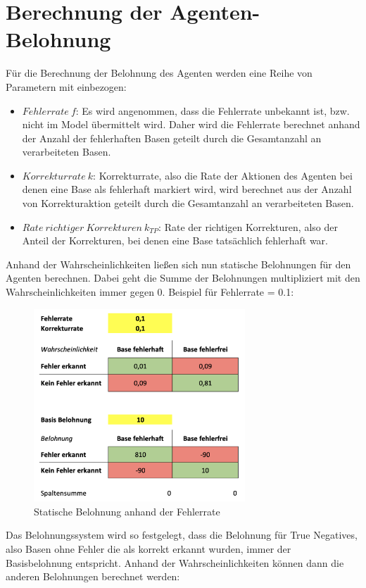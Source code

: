 \documentclass[oneside,bibliography=totocnumbered,BCOR=5mm]{scrbook}%
\theoremstyle{definition}
\theoremstyle{definition}
\theoremstyle{definition}
\theoremstyle{definition}
\theoremstyle{definition}
\theoremstyle{definition}
\begin{document}
\section{Berechnung der Agenten-Belohnung}
Für die Berechnung der Belohnung des Agenten werden eine Reihe von Parametern mit einbezogen:
\begin{itemize}
  \item \(Fehlerrate\:f\): Es wird angenommen, dass die Fehlerrate unbekannt ist, bzw. nicht im Model übermittelt wird. 
Daher wird die Fehlerrate berechnet anhand der Anzahl der fehlerhaften Basen geteilt durch 
die Gesamtanzahl an verarbeiteten Basen.
\item \(Korrekturrate\:k\): Korrekturrate, also die Rate der Aktionen des Agenten bei denen eine Base als fehlerhaft markiert wird,
 wird berechnet aus der Anzahl von Korrekturaktion geteilt durch die Gesamtanzahl an verarbeiteten Basen.
 \item \(Rate\:richtiger\:Korrekturen\:k_{TP}\): Rate der richtigen Korrekturen, also der Anteil der Korrekturen, bei
 denen eine Base tatsächlich fehlerhaft war.
\end{itemize}


Anhand der Wahrscheinlichkeiten ließen sich nun statische Belohnungen für den Agenten berechnen.
Dabei geht die Summe der Belohnungen multipliziert mit den Wahrscheinlichkeiten immer gegen 0.
Beispiel für Fehlerrate = 0.1:

\begin{figure}
  \centering
  \includegraphics[width=300px,keepaspectratio]{images/static_reward.png}
  \caption{Statische Belohnung anhand der Fehlerrate}
  \label{basicRewards}
\end{figure}

Das Belohnungssystem wird so festgelegt, dass die Belohnung für True Negatives,
also Basen ohne Fehler die als korrekt erkannt wurden, immer der Basisbelohnung entspricht.
Anhand der Wahrscheinlichkeiten können dann die anderen Belohnungen berechnet werden:
\linebreak[4]
\end{document}
